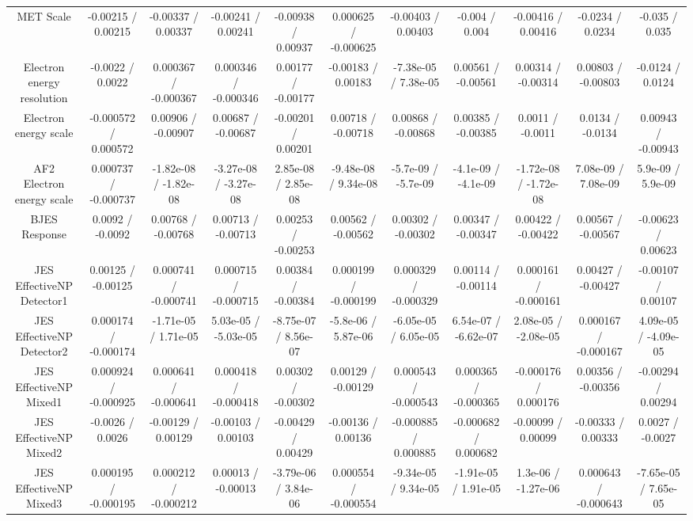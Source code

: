 \begin{table}[htbp]
\begin{center}
\begin{tabular}{|c|c|c|c|c|c|c|c|c|c|c|}
  MET Scale & -0.00215 / 0.00215 & -0.00337 / 0.00337 & -0.00241 / 0.00241 & -0.00938 / 0.00937 & 0.000625 / -0.000625 & -0.00403 / 0.00403 & -0.004 / 0.004 & -0.00416 / 0.00416 & -0.0234 / 0.0234 & -0.035 / 0.035 \\ 
  Electron energy resolution & -0.0022 / 0.0022 & 0.000367 / -0.000367 & 0.000346 / -0.000346 & 0.00177 / -0.00177 & -0.00183 / 0.00183 & -7.38e-05 / 7.38e-05 & 0.00561 / -0.00561 & 0.00314 / -0.00314 & 0.00803 / -0.00803 & -0.0124 / 0.0124 \\ 
  Electron energy scale & -0.000572 / 0.000572 & 0.00906 / -0.00907 & 0.00687 / -0.00687 & -0.00201 / 0.00201 & 0.00718 / -0.00718 & 0.00868 / -0.00868 & 0.00385 / -0.00385 & 0.0011 / -0.0011 & 0.0134 / -0.0134 & 0.00943 / -0.00943 \\ 
  AF2 Electron energy scale & 0.000737 / -0.000737 & -1.82e-08 / -1.82e-08 & -3.27e-08 / -3.27e-08 & 2.85e-08 / 2.85e-08 & -9.48e-08 / 9.34e-08 & -5.7e-09 / -5.7e-09 & -4.1e-09 / -4.1e-09 & -1.72e-08 / -1.72e-08 & 7.08e-09 / 7.08e-09 & 5.9e-09 / 5.9e-09 \\ 
  BJES Response & 0.0092 / -0.0092 & 0.00768 / -0.00768 & 0.00713 / -0.00713 & 0.00253 / -0.00253 & 0.00562 / -0.00562 & 0.00302 / -0.00302 & 0.00347 / -0.00347 & 0.00422 / -0.00422 & 0.00567 / -0.00567 & -0.00623 / 0.00623 \\ 
  JES EffectiveNP Detector1 & 0.00125 / -0.00125 & 0.000741 / -0.000741 & 0.000715 / -0.000715 & 0.00384 / -0.00384 & 0.000199 / -0.000199 & 0.000329 / -0.000329 & 0.00114 / -0.00114 & 0.000161 / -0.000161 & 0.00427 / -0.00427 & -0.00107 / 0.00107 \\ 
  JES EffectiveNP Detector2 & 0.000174 / -0.000174 & -1.71e-05 / 1.71e-05 & 5.03e-05 / -5.03e-05 & -8.75e-07 / 8.56e-07 & -5.8e-06 / 5.87e-06 & -6.05e-05 / 6.05e-05 & 6.54e-07 / -6.62e-07 & 2.08e-05 / -2.08e-05 & 0.000167 / -0.000167 & 4.09e-05 / -4.09e-05 \\ 
  JES EffectiveNP Mixed1 & 0.000924 / -0.000925 & 0.000641 / -0.000641 & 0.000418 / -0.000418 & 0.00302 / -0.00302 & 0.00129 / -0.00129 & 0.000543 / -0.000543 & 0.000365 / -0.000365 & -0.000176 / 0.000176 & 0.00356 / -0.00356 & -0.00294 / 0.00294 \\ 
  JES EffectiveNP Mixed2 & -0.0026 / 0.0026 & -0.00129 / 0.00129 & -0.00103 / 0.00103 & -0.00429 / 0.00429 & -0.00136 / 0.00136 & -0.000885 / 0.000885 & -0.000682 / 0.000682 & -0.00099 / 0.00099 & -0.00333 / 0.00333 & 0.0027 / -0.0027 \\ 
  JES EffectiveNP Mixed3 & 0.000195 / -0.000195 & 0.000212 / -0.000212 & 0.00013 / -0.00013 & -3.79e-06 / 3.84e-06 & 0.000554 / -0.000554 & -9.34e-05 / 9.34e-05 & -1.91e-05 / 1.91e-05 & 1.3e-06 / -1.27e-06 & 0.000643 / -0.000643 & -7.65e-05 / 7.65e-05 \\ 

\end{tabular}
\end{center}
\end{table}
